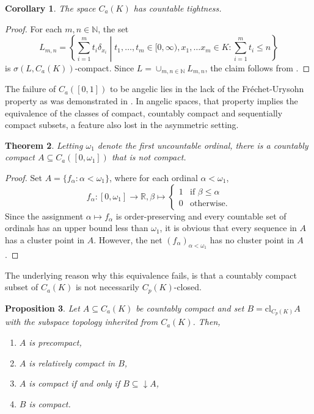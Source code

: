 \documentclass[
	paper=A4,
	pagesize=auto,
	fontsize=12pt
]{scrartcl}
\theoremstyle{plain}
\newtheorem{theorem}{Theorem}[section]
\newtheorem{proposition}[theorem]{Proposition}
\newtheorem{corollary}[theorem]{Corollary}
\theoremstyle{remark}
\theoremstyle{definition}
\begin{document}
%
\begin{corollary}
The space $C_a(K)$ has countable tightness.
\end{corollary}
\begin{proof}
For each $m, n \in \mathbb{N}$, the set
%
\begin{equation}
L_{m,n} = \left\{ \sum_{i = 1}^m t_i \delta_{x_i} \middle| t_1, \dots, t_m \in [0, \infty), x_1, \dots x_m \in K : \sum_{i = 1}^m t_i \le n \right\}
\end{equation}
%
is $\sigma(L,C_a(K))$-compact.
Since $L = \cup_{m,n \in \mathbb{N}} L_{m,n}$, the claim follows from .
\end{proof}
%
The failure of $C_a([0,1])$ to be angelic lies in the lack of the Fréchet-Urysohn property as was demonstrated in .
In angelic spaces, that property implies the equivalence of the classes of compact, countably compact and sequentially compact subsets, a feature also lost in the asymmetric setting.
%
\begin{theorem}
Letting $\omega_1$ denote the first uncountable ordinal, there is a countably compact $A \subseteq C_a([0, \omega_1])$ that is not compact.
\end{theorem}
\begin{proof}
Set $A = \{ f_\alpha : \alpha < \omega_1 \}$, where for each ordinal $\alpha < \omega_1$,
%
\begin{equation}
f_\alpha : [0, \omega_1] \to \mathbb{R},
\beta \mapsto \begin{cases}
1 & \text{if } \beta \le \alpha \\
0 & \text{otherwise.}
\end{cases}
\end{equation}
%
Since the assignment $\alpha \mapsto f_\alpha$ is order-preserving and every countable set of ordinals has an upper bound less than $\omega_1$, it is obvious that every sequence in $A$ has a cluster point in $A$.
However, the net $(f_\alpha)_{\alpha < \omega_1}$ has no cluster point in $A$.
\end{proof}
%
The underlying reason why this equivalence fails, is that a countably compact subset of $C_a(K)$ is not necessarily $C_p(K)$-closed.
%
\begin{proposition}
\label{prop:CountablyCompactIsCompactCharacterisation}
Let $A \subseteq C_a(K)$ be countably compact and set $B = \mathrm{cl}_{C_p(K)} A$ with the subspace topology inherited from $C_a(K)$.
Then,
%
\begin{enumerate}
\item $A$ is precompact,
\item $A$ is relatively compact in $B$,
\item $A$ is compact if and only if $B \subseteq \downarrow A$,
\item $B$ is compact.
\end{enumerate}
\end{proposition}
\end{document}
